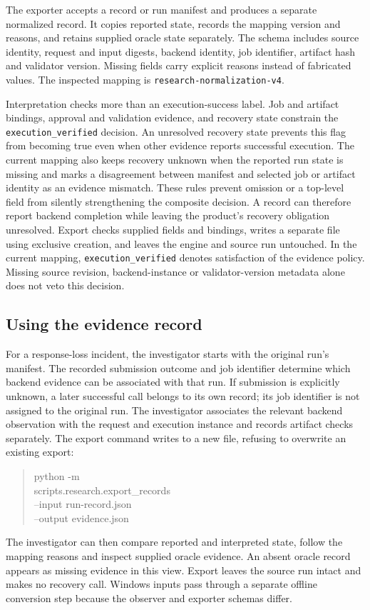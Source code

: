\documentclass{ieeeaccess}
\begin{document}
The exporter accepts a record or run manifest and produces a separate normalized
record. It copies reported state, records the mapping version and reasons, and
retains supplied oracle state separately. The schema includes source identity,
request and input digests, backend identity, job identifier, artifact hash and
validator version. Missing fields carry explicit reasons instead of fabricated
values. The inspected mapping is \texttt{research-normalization-v4}.

Interpretation checks more than an execution-success label. Job and artifact
bindings, approval and validation evidence, and recovery state constrain the
\texttt{execution\_\allowbreak verified} decision. An unresolved recovery state prevents this flag
from becoming true even when other evidence reports successful execution.
The current mapping also keeps recovery unknown when the reported run state is
missing and marks a disagreement between manifest and selected job or artifact
identity as an evidence mismatch. These rules prevent omission or a top-level
field from silently strengthening the composite decision.
A record can therefore report backend completion while leaving the product's
recovery obligation unresolved. Export checks supplied fields and bindings,
writes a separate file using exclusive creation, and leaves the engine and
source run untouched. In the current mapping, \texttt{execution\_\allowbreak verified}
denotes satisfaction of the evidence policy. Missing source revision,
backend-instance or validator-version metadata alone does not veto this decision.

\subsection{Using the evidence record}

For a response-loss incident, the investigator starts with the original run's
manifest. The recorded submission outcome and job identifier determine which
backend evidence can be associated with that run. If submission is explicitly
unknown, a later successful call belongs to its own record; its job identifier
is not assigned to the original run. The investigator associates the relevant
backend observation with the request and execution instance and records
artifact checks separately. The export command writes to a new file, refusing
to overwrite an existing export:
\begin{quote}\footnotesize\ttfamily\raggedright
python -m\\
scripts.research.export\_records\\
--input run-record.json\\
--output evidence.json
\end{quote}
The investigator can then compare reported and interpreted state, follow the
mapping reasons and inspect supplied oracle evidence. An absent oracle record
appears as missing evidence in this view. Export leaves the source run intact
and makes no recovery call. Windows inputs pass through a separate offline
conversion step because the observer and exporter schemas differ.
\end{document}
